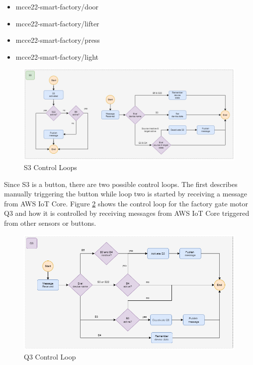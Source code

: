 \begin{itemize}
	\item mcce22-smart-factory/door
	\item mcce22-smart-factory/lifter
	\item mcce22-smart-factory/press
	\item mcce22-smart-factory/light
\end{itemize}

\begin{figure}[H]
	\centering
	\includegraphics[width=15cm]{images/flowchart_s3.png}
	\caption{S3 Control Loops}    
	\label{fig:FlowChartS3}
\end{figure}

Since S3 is a button, there are two possible control loops. The first describes manually triggering the button while loop two is started by receiving a message from AWS IoT Core. Figure \ref{fig:FlowChartQ3}  shows the control loop for the factory gate motor Q3 and how it is controlled by receiving messages from AWS IoT Core triggered from other sensors or buttons.

\begin{figure}[H]
	\centering
	\includegraphics[width=13cm]{images/flowchart_q3.png}
	\caption{Q3 Control Loop}    
	\label{fig:FlowChartQ3}
\end{figure}

